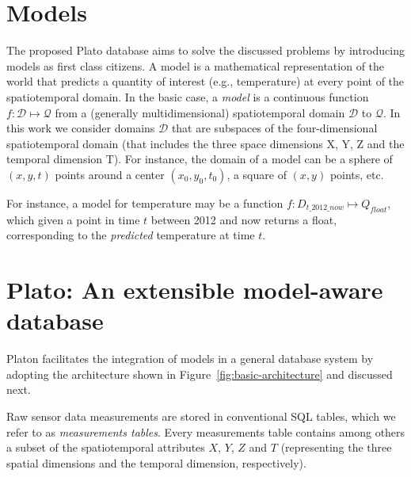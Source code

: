 
\section{Models}
\label{sec:models}


The proposed Plato database aims to solve the discussed problems by introducing models as first class citizens. A model is a mathematical representation of the world that predicts a quantity of interest (e.g., temperature) at every point of the spatiotemporal domain.
In the basic case, a {\em model} is a continuous function $f:\mathcal{D}\mapsto \mathcal{Q}$ from a (generally multidimensional) spatiotemporal domain $\mathcal{D}$ to $\mathcal{Q}$. In this work we consider domains $\mathcal{D}$ that are subspaces of the four-dimensional spatiotemporal domain (that includes the three space dimensions X, Y, Z and the temporal dimension T). For instance, the domain of a model can be a sphere of $(x, y, t)$ points around a center $(x_0, y_0, t_0)$, a square of $(x, y)$ points, etc.

\vspace*{0.5cm}
\begin{example}
For instance, a model for temperature may be a function $f:D_{t\_2012\_now}\mapsto Q_{float}$, which given a point in time $t$ between 2012 and now returns a float, corresponding to the \emph{predicted} temperature at time $t$.
\end{example}
\vspace*{0.5cm}

\section{Plato: An extensible model-aware database}
\label{sec:architecture}

Platon facilitates the integration of models in a general database system by adopting the architecture shown in Figure~\ref{fig:basic-architecture} and discussed next.

Raw sensor data measurements are stored in conventional SQL tables, which we refer to as {\em measurements tables}. Every measurements table contains among others a subset of the spatiotemporal attributes $X$, $Y$, $Z$ and $T$ (representing the three spatial dimensions and the temporal dimension, respectively).

